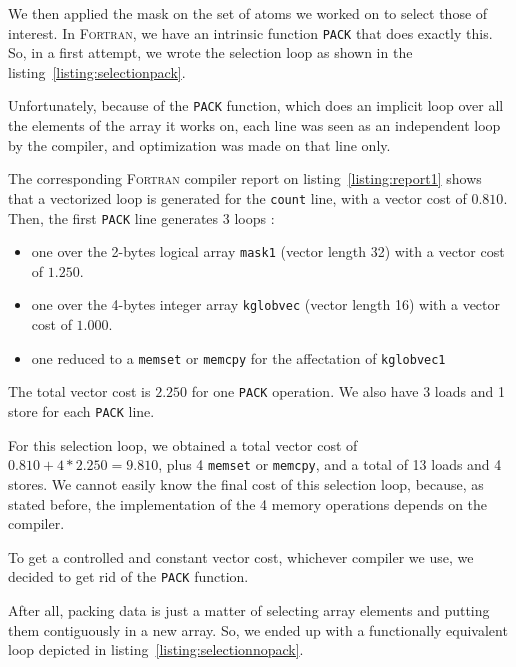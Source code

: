 \documentclass[9pt,comparison]{livecoms}
\newcommand{\lv}{\Large\verb}
\begin{document}
We then applied the mask on the set of atoms we worked on to select those of interest. In \textsc{Fortran}, we have an intrinsic function {\color{blue}\lv|PACK|} that does exactly this. So, in a first attempt, we wrote the selection loop as shown in the listing~\ref{listing:selectionpack}. 

Unfortunately, because of the {\color{blue}\lv|PACK|} function, which does an implicit loop over all the elements of the array it works on, each line was seen as an independent loop by the compiler, and optimization was made on that line only. 


The corresponding \textsc{Fortran} compiler report on  listing~\ref{listing:report1} shows that a vectorized loop is generated for the {\color{blue}\lv|count|} line, with a vector cost of $0.810$. Then, the first {\color{blue}\lv|PACK|} line generates 3 loops :
\begin{itemize}
    \item one over the 2-bytes logical array {\color{blue}\lv|mask1|} (vector length 32) with a vector cost of $1.250$.
    \item one over the 4-bytes integer array {\color{blue}\lv|kglobvec|} (vector length 16) with a vector cost of $1.000$.
    \item one reduced to a {\color{codegreen}\lv|memset|} or {\color{codegreen}\lv|memcpy|} for the affectation of {\color{blue}\lv|kglobvec1|}
\end{itemize}

The total vector cost is $2.250$ for one {\color{blue}\lv|PACK|} operation. We also have 3 loads and 1 store for each {\color{blue}\lv|PACK|} line.

For this selection loop, we obtained a total vector cost of $0.810 + 4*2.250 = 9.810$, plus 4 {\color{codegreen}\lv|memset|} or {\color{codegreen}\lv|memcpy|}, and a total of 13 loads and 4 stores. We cannot easily know the final cost of this selection loop, because, as stated before, the implementation of the 4 memory operations depends on the compiler.

To get a controlled and constant vector cost, whichever compiler we use, we decided to get rid of the {\color{blue}\lv|PACK|} function. 

After all, packing data is just a matter of selecting array elements and putting them contiguously in a new array. So, we ended up with a functionally equivalent loop depicted in listing~\ref{listing:selectionnopack}.
\end{document}
